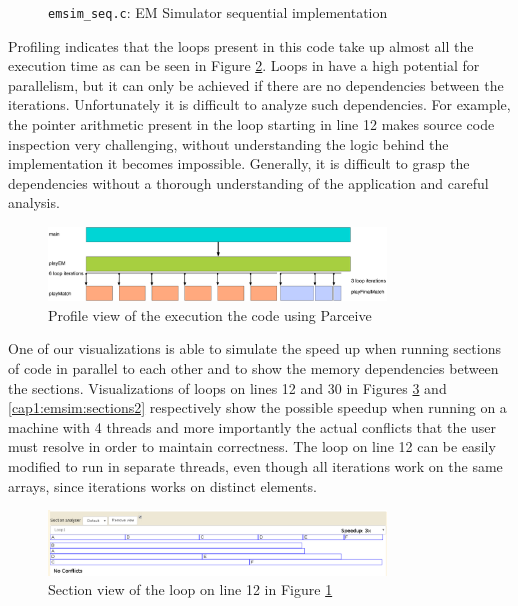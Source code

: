 \begin{figure}
	\begin{center}
		\inputminted[linenos, fontsize=\scriptsize]{c}{emsim_seq.c}
	\end{center}
	\caption{\texttt{emsim\_seq.c}: EM Simulator sequential implementation}
	\label{cap1:emsim:seq}
\end{figure}

Profiling indicates that the loops present in this code take up almost all the execution time as can be seen in Figure \ref{cap1:emsim:profile}. Loops in have a high potential for parallelism, but it can only be achieved if there are no dependencies between the iterations. Unfortunately it is difficult to analyze such dependencies. For example, the pointer arithmetic present in the loop starting in line 12 makes source code inspection very challenging, without understanding the logic behind the implementation it becomes impossible. Generally, it is difficult to grasp the dependencies without a thorough understanding of the application and careful analysis. 

\begin{figure}[!ht]
	\centering
	\includegraphics[width=0.8\textwidth]{emsimprofile}
	\caption{Profile view of the execution the code using Parceive}
	\label{cap1:emsim:profile}
\end{figure}

One of our visualizations is able to simulate the speed up when running sections of code in parallel to each other and to show the memory dependencies between the sections. Visualizations of loops on lines 12 and 30 in Figures \ref{cap1:emsim:sections1} and \ref{cap1:emsim:sections2} respectively show the possible speedup when running on a machine with 4 threads and more importantly the actual conflicts that the user must resolve in order to maintain correctness. The loop on line 12 can be easily modified to run in separate threads, even though all iterations work on the same arrays, since iterations works on distinct elements.

\begin{figure}[!ht]
	\centering
	\includegraphics[width=0.8\textwidth]{loop1section}
	\caption{Section view of the loop on line 12 in Figure \ref{cap1:emsim:seq}}
	\label{cap1:emsim:sections1}
\end{figure}

